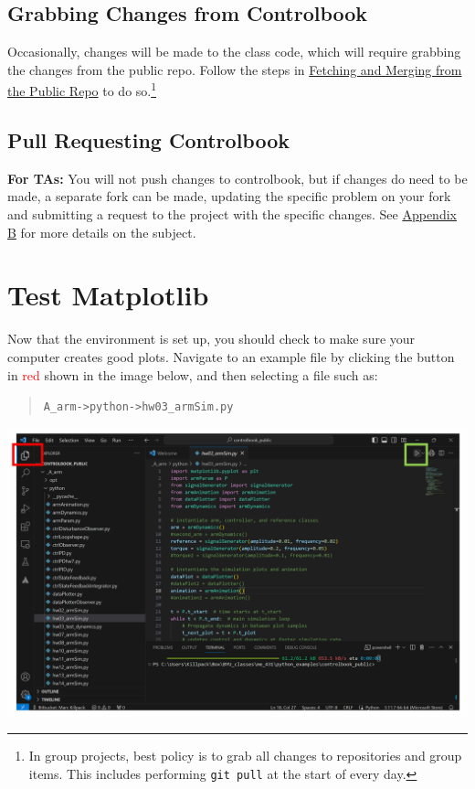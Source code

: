 \documentclass{article}
\begin{document}
\subsection{Grabbing Changes from Controlbook}
Occasionally, changes will be made to the class code, which will require grabbing the changes from the public repo. Follow the steps in \hyperref[copy-repo]{Fetching and Merging from the Public Repo}  to do so.\footnote{In group projects, best policy is to grab all changes to repositories and group items. This includes performing \texttt{git pull} at the start of every day.}


\subsection{Pull Requesting Controlbook}
\textbf{For TAs:} You will not push changes to controlbook, but if changes do need to be made, a separate fork can be made, updating the specific problem on your fork and submitting a request to the project with the specific changes. See \hyperref[appendix-b]{Appendix B} for more details on the subject. 

\section{Test Matplotlib}

Now that the environment is set up, you should check to make sure your computer creates good plots. Navigate to an example file by clicking the button in \textcolor{red}{red} shown in the image below, and then selecting a file such as:

\begin{quote}
\texttt{A\_arm->python->hw03\_armSim.py}
\end{quote}


\begin{center}
    \includegraphics[width=\linewidth]{pic8-red-green.png} 
\end{center}
\end{document}
